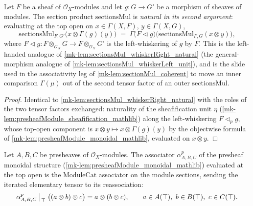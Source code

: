 \begin{lemma}\label{mk-lem:sectionsMul_whiskerLeft_natural}
  \leanok

  Let \(F\) be a sheaf of \(\mathcal{O}_X\)-modules and let \(g : G \to G'\) be a
  morphism of sheaves of modules. The section product \(\mathrm{sectionsMul}\) is
  \emph{natural in its second argument}: evaluating at the top open on
  \(x \in \Gamma(X,F)\), \(y \in \Gamma(X,G)\),
  \[
    \mathrm{sectionsMul}_{F,G'}\bigl(x \otimes \Gamma(g)(y)\bigr)
      \;=\;
    \Gamma\bigl(F \lhd g\bigr)\bigl(\mathrm{sectionsMul}_{F,G}(x \otimes y)\bigr),
  \]
  where \(F \lhd g : F \otimes_{\mathcal{O}_X} G \to F \otimes_{\mathcal{O}_X} G'\) is
  the left-whiskering of \(g\) by \(F\). This is the left-handed analogue of
  \ref{mk-lem:sectionsMul_whiskerRight_natural} (the general-morphism analogue of
  \ref{mk-lem:sectionsMul_whiskerLeft_unit}), and is the slide used in the associativity
  leg of \ref{mk-lem:sectionMul_coherent} to move an inner comparison \(\Gamma(\mu)\) out
  of the second tensor factor of an outer \(\mathrm{sectionsMul}\).
\end{lemma}

\begin{proof}
  \leanok
  Identical to \ref{mk-lem:sectionsMul_whiskerRight_natural} with the roles of the two
  tensor factors exchanged: naturality of the sheafification unit \(\eta\)
  (\ref{mk-lem:presheafModule_sheafification_mathlib}) along the left-whiskering
  \(F \lhd_p g\), whose top-open component is
  \(x \otimes y \mapsto x \otimes \Gamma(g)(y)\) by the objectwise formula of
  \ref{mk-lem:presheafModule_monoidal_mathlib}, evaluated on \(x \otimes y\).
\end{proof}

\begin{lemma}\label{mk-lem:presheafAssociator_top_apply}
  \leanok

  Let \(A, B, C\) be presheaves of \(\mathcal{O}_X\)-modules. The associator
  \(\alpha^{p}_{A,B,C}\) of the presheaf monoidal structure
  (\ref{mk-lem:presheafModule_monoidal_mathlib}) evaluated at the top open is the
  \(\mathrm{ModuleCat}\) associator on the module sections, sending the iterated
  elementary tensor to its reassociation:
  \[
    \alpha^{p}_{A,B,C}\bigm|_{\top}\bigl((a \otimes b) \otimes c\bigr)
      = a \otimes (b \otimes c),
    \qquad a \in A(\top),\ b \in B(\top),\ c \in C(\top).
  \]
\end{lemma}

